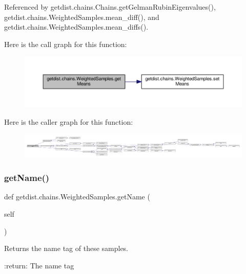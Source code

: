 Referenced by getdist.\+chains.\+Chains.\+get\+Gelman\+Rubin\+Eigenvalues(), getdist.\+chains.\+Weighted\+Samples.\+mean\+\_\+diff(), and getdist.\+chains.\+Weighted\+Samples.\+mean\+\_\+diffs().

Here is the call graph for this function\+:
\nopagebreak
\begin{figure}[H]
\begin{center}
\leavevmode
\includegraphics[width=350pt]{classgetdist_1_1chains_1_1WeightedSamples_aa5d70ded54742f3296cd856a8a1fa185_cgraph}
\end{center}
\end{figure}
Here is the caller graph for this function\+:
\nopagebreak
\begin{figure}[H]
\begin{center}
\leavevmode
\includegraphics[width=350pt]{classgetdist_1_1chains_1_1WeightedSamples_aa5d70ded54742f3296cd856a8a1fa185_icgraph}
\end{center}
\end{figure}
\mbox{\label{classgetdist_1_1chains_1_1WeightedSamples_acdd7cf1a0640abaf1c5d82ea345e031d}} 
\subsubsection{\texorpdfstring{get\+Name()}{getName()}}
{\footnotesize\ttfamily def getdist.\+chains.\+Weighted\+Samples.\+get\+Name (\begin{DoxyParamCaption}\item[{}]{self }\end{DoxyParamCaption})}

\begin{DoxyVerb}Returns the name tag of these samples.

:return: The name tag
\end{DoxyVerb}
 

